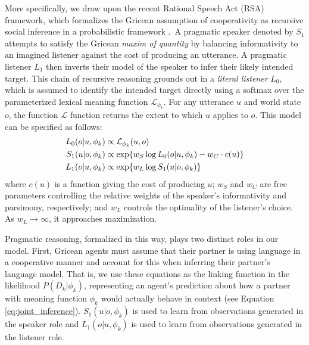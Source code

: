 More specifically, we draw upon the recent Rational Speech Act (RSA) framework, which formalizes the Gricean assumption of cooperativity as recursive social inference in a probabilistic framework \cite{frank_predicting_2012,goodman_pragmatic_2016,FrankeJager16_ProbabilisticPragmatics}.~A pragmatic speaker denoted by $S_1$ attempts to satisfy the Gricean \emph{maxim of quantity} by balancing informativity to an imagined listener against the cost of producing an utterance. 
A pragmatic listener $L_1$ then inverts their model of the speaker to infer their likely intended target.
This chain of recursive reasoning grounds out in a \emph{literal listener} $L_0$, which is assumed to identify the intended target directly using a softmax over the parameterized lexical meaning function $\mathcal{L}_{\phi_k}$.
For any utterance $u$ and world state $o$, the function $\mathcal{L}$ function returns the extent to which $u$ applies to $o$.
This model can be specified as follows:
\begin{align}
L_0(o | u, \phi_k) &\propto  \mathcal{L}_{\phi_k}(u,o)\hfill\label{eq:RSA}\\
S_1(u | o, \phi_k) &\propto   \exp\{w_S \log L_0(o | u, \phi_k) - w_C \cdot c(u)\}\nonumber   \\
L_1(o | u, \phi_k) &\propto   \exp\{w_L \log S_1(u | o, \phi_k)\}\nonumber
\end{align}
where $c(u)$ is a function giving the cost of producing $u$; $w_S$ and $w_C$ are free parameters controlling the relative weights of the speaker's informativity and parsimony, respectively; and $w_L$ controls the optimality of the listener's choice. 
As $w_L \rightarrow \infty$, it approaches maximization.

Pragmatic reasoning, formalized in this way, plays two distinct roles in our model.
First, Gricean agents must assume that their partner is using language in a cooperative manner and account for this when inferring their partner's language model.
That is, we use these equations as the linking function in the likelihood $P(D_k | \phi_k)$, representing an agent's prediction about how a partner with meaning function $\phi_k$ would actually behave in context (see Equation \ref{eq:joint_inference}). 
$S_1(u|o,\phi_k)$ is used to learn from observations generated in the speaker role and $L_1(o|u,\phi_k)$ is used to learn from observations generated in the listener role.

